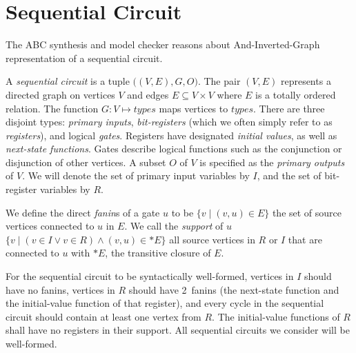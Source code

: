 \section{Sequential Circuit}
\label{sec:preliminaries}

The ABC synthesis and model checker reasons about And-Inverted-Graph 
representation of a sequential circuit.

\begin{definition}
\rm A {\em sequential circuit} is a tuple $\big( (V, E),G,
O\big)$.  The pair $(V,E)$ represents a directed graph on
vertices $V$ and edges $E \subseteq V\times V$ where $E$
is a totally ordered relation.  The function $G: V \mapsto
{\mathit types}$ maps vertices to ${\mathit types}$.
There are three disjoint types: {\em primary inputs}, {\em
bit-registers} (which we often simply refer to as {\em
registers}), and logical {\em gates}.  Registers have designated
{\em initial values}, as well as {\em next-state
functions}.  Gates describe logical functions such as
the conjunction or disjunction of other vertices. 
A subset $O$ of $V$ is specified as the {\em
primary outputs} of $V$.  
We will denote the set of primary input variables by $I$,
and the set of bit-register variables by $R$.  
\label{def:back:seq_circuit}
\end{definition}

\begin{definition}[Fanins]
\rm We define the direct {\em fanin}s of a gate $u$ to be
$\{v \mid (v,u)\in E\}$ the set of source vertices connected
to $u$ in $E$.  We call the {\em support} of $u$ $\{v \mid
(v\in I \vee v \in R) \wedge (v,u) \in \ast E\}$ all
source vertices in $R$ or $I$ that are connected to $u$
with $\ast E$, the transitive closure of $E$.
\label{def:back:fanins} 
\end{definition}


For the sequential
circuit to be syntactically well-formed, vertices in $I$
should have no fanins, vertices in $R$ should have
2~fanins (the next-state function and the initial-value
function of that register), %
and every cycle in the sequential circuit should contain
at least one vertex from $R$.  The initial-value functions
of $R$ shall have no registers in their support.  All
sequential circuits we consider will be well-formed.  

